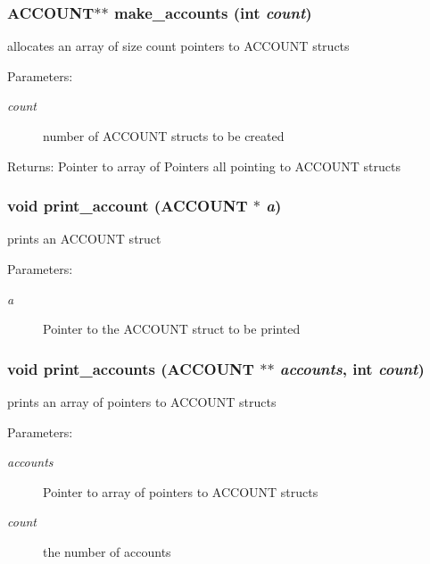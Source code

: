 \subsubsection{\setlength{\rightskip}{0pt plus 5cm}\bf{ACCOUNT}$\ast$$\ast$ make\_\-accounts (int {\em count})}\label{account_8c_fcec3d35dd33937a527786df8a1c8c72}


allocates an array of size count pointers to ACCOUNT structs \begin{Desc}
\item[Parameters:]
\begin{description}
\item[{\em count}]number of ACCOUNT structs to be created \end{description}
\end{Desc}
\begin{Desc}
\item[Returns:]Pointer to array of Pointers all pointing to ACCOUNT structs \end{Desc}
\subsubsection{\setlength{\rightskip}{0pt plus 5cm}void print\_\-account (\bf{ACCOUNT} $\ast$ {\em a})}\label{account_8c_b9c0ff73f07894ea51b33567fc95a00d}


prints an ACCOUNT struct \begin{Desc}
\item[Parameters:]
\begin{description}
\item[{\em a}]Pointer to the ACCOUNT struct to be printed \end{description}
\end{Desc}
\subsubsection{\setlength{\rightskip}{0pt plus 5cm}void print\_\-accounts (\bf{ACCOUNT} $\ast$$\ast$ {\em accounts}, int {\em count})}\label{account_8c_78b27a8dc21e4b8862ba11124dda65f7}


prints an array of pointers to ACCOUNT structs \begin{Desc}
\item[Parameters:]
\begin{description}
\item[{\em accounts}]Pointer to array of pointers to ACCOUNT structs \item[{\em count}]the number of accounts \end{description}
\end{Desc}
